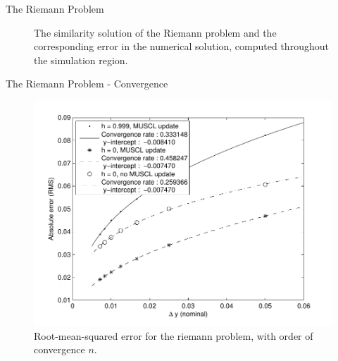 \documentclass{beamer}
\begin{document}
\begin{frame}{The Riemann Problem}
\begin{figure}[htbp]
   \centering
      \begin{subfigmatrix}{2}
      \end{subfigmatrix}
   \caption{The similarity solution of the Riemann problem and the corresponding error in the numerical solution, computed throughout the simulation region.}
   \label{fig:riemann_similarity}
\end{figure}

\end{frame}

\begin{frame}{The Riemann Problem - Convergence}
\begin{figure}[htbp]%
   \centering
   \includegraphics[width=.6\textwidth]{Riemann_convergence.pdf} 
   \caption{Root-mean-squared error for the riemann problem, with order of convergence $n$.}
   \label{fig:riemann_convergence}
\end{figure}
\end{frame}
\end{document}
